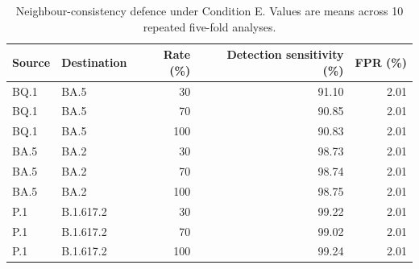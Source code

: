 \begin{table}[htbp]
\centering
\caption{Neighbour-consistency defence under Condition E. Values are means across 10 repeated five-fold analyses.}
\label{tab:conditionE_defence}
\begin{tabular}{llrrr}
\toprule
\textbf{Source} & \textbf{Destination} & \textbf{Rate (\%)} & \textbf{Detection sensitivity (\%)} & \textbf{FPR (\%)} \\
\midrule
BQ.1 & BA.5 & 30 & 91.10 & 2.01 \\
BQ.1 & BA.5 & 70 & 90.85 & 2.01 \\
BQ.1 & BA.5 & 100 & 90.83 & 2.01 \\
BA.5 & BA.2 & 30 & 98.73 & 2.01 \\
BA.5 & BA.2 & 70 & 98.74 & 2.01 \\
BA.5 & BA.2 & 100 & 98.75 & 2.01 \\
P.1 & B.1.617.2 & 30 & 99.22 & 2.01 \\
P.1 & B.1.617.2 & 70 & 99.02 & 2.01 \\
P.1 & B.1.617.2 & 100 & 99.24 & 2.01 \\
\bottomrule
\end{tabular}
\end{table}
